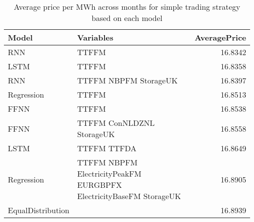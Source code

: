 \begin{table}[h!]
\centering
 \begin{adjustbox}{max width=\textwidth}
\begin{tabular}{llr}
  \hline
Model & Variables & AveragePrice \\ 
  \hline
RNN & TTFFM  & 16.8342 \\ 
  LSTM & TTFFM  & 16.8358 \\ 
  RNN & TTFFM NBPFM StorageUK & 16.8397 \\ 
  Regression & TTFFM  & 16.8513 \\ 
  FFNN & TTFFM  & 16.8538 \\ 
  FFNN & TTFFM ConNLDZNL StorageUK & 16.8558 \\ 
  LSTM & TTFFM TTFDA & 16.8649 \\ 
  Regression & TTFFM NBPFM ElectricityPeakFM EURGBPFX ElectricityBaseFM StorageUK & 16.8905 \\ 
  EqualDistribution &  & 16.8939 \\ 
   \hline
 \end{tabular}
\end{adjustbox}
\caption{Average price per MWh across months for simple trading strategy based on each model} 
\label{tab:binary.trade.short}
\end{table}

